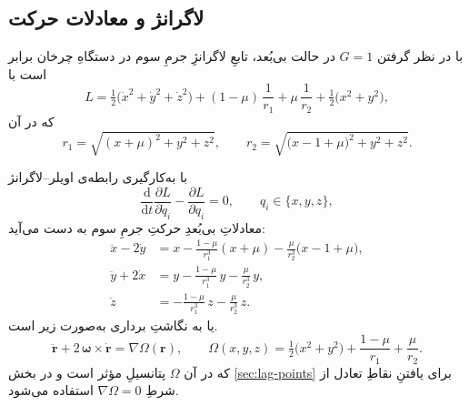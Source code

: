 \subsection{لاگرانژ و معادلات حرکت}
با در نظر گرفتن
$G=1$
در حالت بی‌بُعد،
تابعِ لاگرانژِ جرمِ سوم در دستگاهِ چرخان برابر است با\cite{vallado2001fundamentals}
\begin{equation}\label{eq:L_crtbp}
	L=\tfrac12\bigl(\dot x^{2}+\dot y^{2}+\dot z^{2}\bigr)
	+(1-\mu)\,\frac{1}{r_{1}}+\mu\,\frac{1}{r_{2}}
	+\tfrac12\bigl(x^{2}+y^{2}\bigr),
\end{equation}
که در آن
\begin{equation}
	r_{1}=\sqrt{(x+\mu)^{2}+y^{2}+z^{2}},\qquad
	r_{2}=\sqrt{\bigl(x-1+\mu\bigr)^{2}+y^{2}+z^{2}}.
\end{equation}

با به‌کارگیری رابطه‌ی اویلر–لاگرانژ
\begin{equation*}
	\frac{\mathrm d}{\mathrm dt}\frac{\partial L}{\partial \dot q_{i}}-
	\frac{\partial L}{\partial q_{i}}=0,\qquad q_{i}\in\{x,y,z\},
\end{equation*}
معادلاتِ بی‌بُعدِ حرکتِ جرمِ سوم به دست می‌آید:
\begin{align}
	\ddot x-2\dot y &=
	x-\frac{1-\mu}{r_{1}^{3}}(x+\mu)-\frac{\mu}{r_{2}^{3}}\bigl(x-1+\mu\bigr),\\[2pt]
	\ddot y+2\dot x &=
	y-\frac{1-\mu}{r_{1}^{3}}\,y-\frac{\mu}{r_{2}^{3}}\,y,\\[2pt]
	\ddot z &= -\frac{1-\mu}{r_{1}^{3}}\,z-\frac{\mu}{r_{2}^{3}}\,z.
\end{align}
یا به نگاشتِ برداری به‌صورت زیر است.
\begin{equation}
	\ddot{\mathbf r}+2\,\boldsymbol\omega\times\dot{\mathbf r}=\nabla\Omega(\mathbf r),\qquad
	\Omega(x,y,z)=\tfrac12\bigl(x^{2}+y^{2}\bigr)+\frac{1-\mu}{r_{1}}+\frac{\mu}{r_{2}}.
\end{equation}
که در آن $\Omega$ پتانسیلِ مؤثر است و در بخش \ref{sec:lag-points} برای یافتنِ نقاطِ تعادل از شرطِ $\nabla\Omega=0$ استفاده می‌شود.
